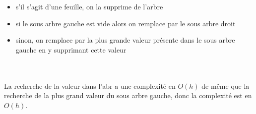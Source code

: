 \documentclass[11pt,a4paper]{article}
\begin{document}
\begin{Exercise*}[title = {Doublons autorisés dans un arbre binaire de recherche}, origin = {\bac \; Oraux {\sc ccinp}}]
{\begin{itemize}
    \item s'il s'agit d'une feuille, on la supprime de l'arbre
    \item si le sous arbre gauche est vide alors on remplace par le sous arbre droit
    \item sinon, on remplace par la plus grande valeur présente dans le sous arbre gauche en y supprimant cette valeur
\end{itemize}
 \quad 
{} \quad
{} \quad
{} 
 \\
 \\
La recherche de la valeur dans l'{\sc abr} a une complexité en $O(h)$ de même que la recherche de la plus grand valeur du sous arbre gauche, donc la complexité est en $O(h)$.
}
\end{Exercise*}
\end{document}
